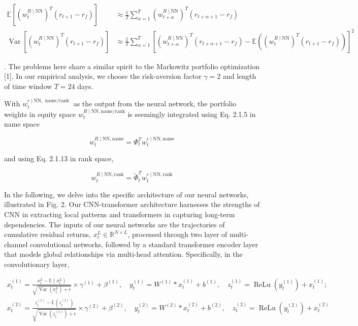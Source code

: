 \documentclass[12pt,article]{memoir}
\begin{document}
$$
\begin{aligned}
\mathbb{E}\left[\left(w_t^{R \mid \mathrm{NN}}\right)^T\left(r_{t+1}-r_f\right)\right] & \approx \frac{1}{T} \sum_{\alpha=1}^T\left(w_{t+\alpha}^{R \mid \mathrm{NN}}\right)^T\left(r_{t+\alpha+1}-r_f\right) \\
\operatorname{Var}\left[\left(w_t^{R \mid \mathrm{NN}}\right)^T\left(r_{t+1}-r_f\right)\right] & \approx \frac{1}{T} \sum_{\alpha=1}^T\left[\left(w_{t+\alpha}^{R \mid \mathrm{NN}}\right)^T\left(r_{t+\alpha+1}-r_f\right)-\mathbb{E}\left(\left(w_t^{R \mid \mathrm{NN}}\right)^T\left(r_{t+1}-r_f\right)\right)\right]^2
\end{aligned}
$$

. The problems here share a similar spirit to the Markowitz portfolio optimization [1]. In our empirical analysis, we choose the risk-aversion factor $\gamma=2$ and length of time window $T=24$ days.

With $w_t^{\epsilon \mid \mathrm{NN}, \text { name/rank }}$ as the output from the neural network, the portfolio weights in equity space $w_t^{R \mid \mathrm{NN}, \mathrm{name} / \mathrm{rank}}$ is seemingly integrated using Eq. 2.1.5 in name space

$$
w_t^{R \mid \mathrm{NN}, \mathrm{name}}=\Phi_t^T w_t^{\epsilon \mid \mathrm{NN}, \mathrm{name}}
$$

and using Eq. 2.1.13 in rank space,

$$
w_t^{R \mid \mathrm{NN}, \mathrm{rank}}=\tilde{\Phi}_t^T w_t^{\epsilon \mid \mathrm{NN}, \mathrm{rank}}
$$

In the following, we delve into the specific architecture of our neural networks, illustrated in Fig. 2. Our CNN-transformer architecture harnesses the strengths of CNN in extracting local patterns and transformers in capturing long-term dependencies. The inputs of our neural networks are the trajectories of cumulative residual returns, $x_t^L \in \mathbb{R}^{N \times L}$, processed through two layer of multi-channel convolutional networks, followed by a standard transformer encoder layer that models global relationships via multi-head attention. Specifically, in the convolutionary layer,

$$
\begin{array}{ll}
x_t^{(1)}=\frac{x_t^L-\mathbb{E}\left(x_t^L\right)}{\sqrt{\operatorname{Var}\left(x_t^L\right)+\epsilon}} \times \gamma^{(1)}+\beta^{(1)}, \quad y_t^{(1)}=W^{(1)} * x_t^{(1)}+b^{(1)}, \quad z_t^{(1)}=\operatorname{ReLu}\left(y_t^{(1)}\right)+x_t^{(1)} ; \\
x_t^{(2)}=\frac{z_t^{(1)}-\mathbb{E}\left(z_t^{(1)}\right)}{\sqrt{\operatorname{Var}\left(z_t^{(1)}\right)+\epsilon}} \times \gamma^{(2)}+\beta^{(2)}, \quad y_t^{(2)}=W^{(2)} * x_t^{(2)}+b^{(2)}, \quad z_t^{(2)}=\operatorname{ReLu}\left(y_t^{(2)}\right)+x_t^{(2)}
\end{array}
$$
\end{document}
